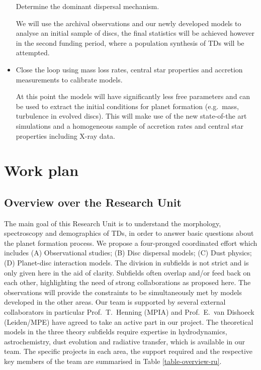 \documentclass[10pt,fleqn,twoside]{article}
\begin{document}
\begin{itemize}
\begin{Emphasize}
  Determine the dominant dispersal mechanism.
\end{Emphasize}
We will
use the archival observations and our newly developed models to analyse
an initial sample of discs, the final statistics will be achieved
however in the second funding period, where a population synthesis of
TDs will be attempted.
\item 
\begin{Emphasize}
  Close the loop using mass loss rates, central star properties and
  accretion measurements to calibrate models.
\end{Emphasize}
At this
point the models will have significantly less free parameters and can
be used to extract the initial conditions for planet formation
(e.g.\ mass, turbulence in evolved discs). This will make use of the new state-of-the
art simulations and a homogeneous sample of accretion rates and central
star properties including X-ray data. 
\end{itemize}

\section{Work plan}

\subsection{Overview over the Research Unit}
%
The main goal of this Research Unit is to understand the morphology,
spectroscopy and demographics of TDs, in order to answer
basic questions about the planet formation process. We propose a
four-pronged coordinated effort which includes (A) Observational
studies; (B) Disc dispersal models; (C) Dust physics; (D) Planet-disc
interaction models. The division in subfields is not strict and is
only given here in the aid of clarity. Subfields often overlap and/or
feed back on each other, highlighting the need of strong
collaborations as proposed here. The observations will provide the
constraints to be simultaneously met by models developed in the other
areas. Our team is supported by several external collaborators in particular
Prof.\ T.\ Henning (MPIA) and Prof.\ E.\ van Dishoeck (Leiden/MPE) have
agreed to take an active part in our project. The theoretical models in the three theory subfields require
expertise in hydrodynamics, astrochemistry, dust evolution and
radiative transfer, which is available in our team. The specific
projects in each area, the support required and the respective key members
of the team are summarised in Table \ref{table-overview-ru}.
\end{document}
